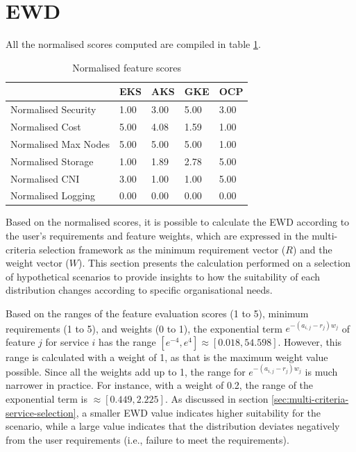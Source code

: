 \FloatBarrier

\section{EWD}


All the normalised scores computed are compiled in table \ref{tab:normalised-scores}. 

\begin{table}[!ht]
    \centering
    \begin{tabular}{|p{4cm}|p{2cm}|p{2cm}|p{2cm}|p{2cm}|} %
    \hline
         & EKS& AKS& GKE& OCP\\ \hline
        Normalised Security& 1.00& 3.00& 5.00& 3.00\\ \hline
        Normalised Cost& 5.00& 4.08& 1.59& 1.00\\ \hline
        Normalised Max Nodes& 5.00& 5.00& 5.00& 1.00\\ \hline
        Normalised Storage& 1.00& 1.89& 2.78& 5.00\\ \hline
        Normalised CNI& 3.00& 1.00& 1.00& 5.00\\ \hline
 Normalised Logging& 0.00& 0.00& 0.00&0.00\\\hline
    \end{tabular}
    \caption{Normalised feature scores} 
    \label{tab:normalised-scores}
\end{table}

Based on the normalised scores, it is possible to calculate the EWD according to the user's requirements and feature weights, which are expressed in the multi-criteria selection framework as the minimum requirement vector ($R$) and the weight vector ($W$). This section presents the calculation performed on a selection of hypothetical scenarios to provide insights to how the suitability of each distribution changes according to specific organisational needs.

Based on the ranges of the feature evaluation scores (1 to 5), minimum requirements (1 to 5), and weights (0 to 1), the exponential term $e^{-(a_{i,j} - r_j)w_j }$ of feature $j$ for service $i$ has the range $\left[e^{-4}, e^{4}\right]\approx \left[0.018,54.598\right]$. However, this range is calculated with a weight of 1, as that is the maximum weight value possible. Since all the weights add up to 1, the range for $e^{-(a_{i,j} - r_j)w_j }$ is much narrower in practice. For instance, with a weight of 0.2, the range of the exponential term is $\approx\left[0.449,2.225\right]$. As discussed in section \ref{sec:multi-criteria-service-selection}, a smaller EWD value indicates higher suitability for the scenario, while a large value indicates that the distribution deviates negatively from the user requirements (i.e., failure to meet the requirements).


